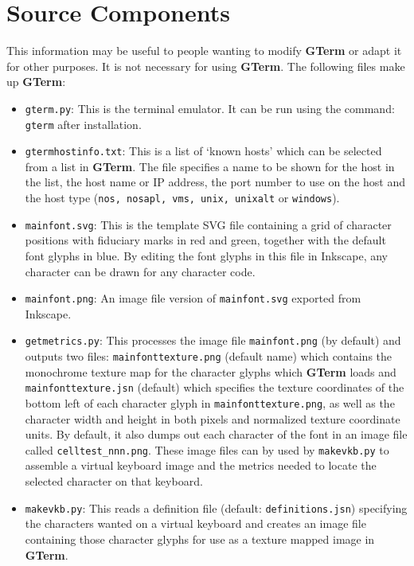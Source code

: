 \documentclass[a4paper,twoside,11pt]{article}
\begin{document}
\section{Source Components}
This information may be useful to people wanting to modify \textbf{GTerm} or
adapt it for other purposes. It is not necessary for using \textbf{GTerm}.
The following files make up \textbf{GTerm}:
\begin{itemize}
\item \texttt{gterm.py}: This is the terminal emulator. It can be run using the command: \texttt{gterm} after installation.
\item \texttt{gtermhostinfo.txt}: This is a list of `known hosts' which can be selected from a list in \textbf{GTerm}. The file
      specifies a name to be shown for the host in the list, the host name or IP address, the port number to use on the
      host and the host type (\texttt{nos, nosapl, vms, unix, unixalt} or \texttt{windows}). 
\item \texttt{mainfont.svg}: This is the template SVG file containing a grid of character positions with fiduciary marks in
      red and green, together with the default font glyphs in blue. By editing the font glyphs in this file in
      Inkscape, any character can be drawn for any character code.
\item \texttt{mainfont.png}: An image file version of \texttt{mainfont.svg} exported from Inkscape.
\item \texttt{getmetrics.py}: This processes the image file \texttt{mainfont.png} (by default) and outputs two files:
      \texttt{mainfonttexture.png}
      (default name) which contains the monochrome texture map for the character glyphs which \textbf{GTerm} loads and 
      \texttt{mainfonttexture.jsn} (default) which specifies the texture coordinates of the bottom left of each character glyph
      in \texttt{mainfonttexture.png}, as well as the character width and height in both pixels and normalized texture
      coordinate units. By default, it also dumps out each character of the font in an image file called
      \texttt{celltest\_nnn.png}. These image files can by used by \texttt{makevkb.py}
      to assemble a virtual keyboard image and the metrics
      needed to locate the selected character on that keyboard.
\item \texttt{makevkb.py}: This reads a definition file (default: \texttt{definitions.jsn})
      specifying the characters wanted on a virtual
      keyboard and creates an image file containing those character glyphs for use as a texture mapped image in \textbf{GTerm}.

\end{itemize}
\end{document}
